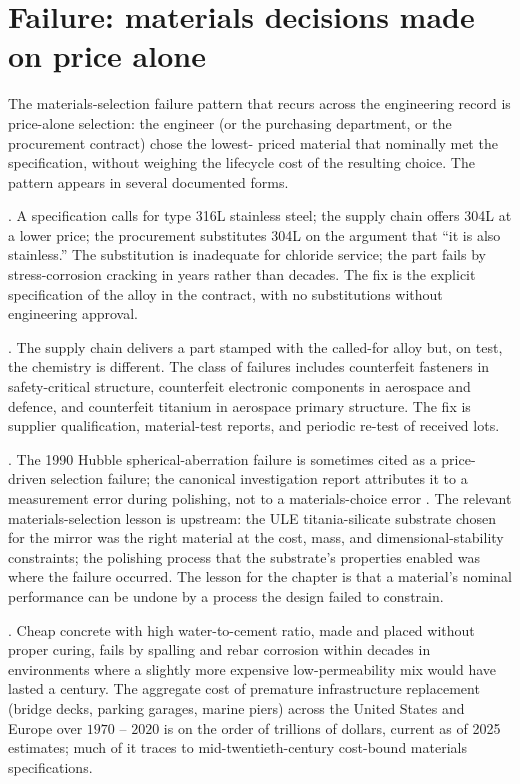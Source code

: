 \section{Failure: materials decisions made on price alone}

The materials-selection failure pattern that recurs across the
engineering record is price-alone selection: the engineer (or the
purchasing department, or the procurement contract) chose the lowest-
priced material that nominally met the specification, without
weighing the lifecycle cost of the resulting choice. The pattern
appears in several documented forms.

. A
specification calls for type 316L stainless steel; the supply chain
offers 304L at a lower price; the procurement substitutes 304L on the
argument that ``it is also stainless.'' The substitution is
inadequate for chloride service; the part fails by stress-corrosion
cracking in years rather than decades. The fix is the explicit
specification of the alloy in the contract, with no substitutions
without engineering approval.

. The supply chain
delivers a part stamped with the called-for alloy but, on test, the
chemistry is different. The class of failures includes counterfeit
fasteners in safety-critical structure, counterfeit electronic
components in aerospace and defence, and counterfeit titanium in
aerospace primary structure. The fix is supplier qualification,
material-test reports, and periodic re-test of received lots.

. The 1990 Hubble
spherical-aberration failure is sometimes cited as a price-driven
selection failure; the canonical investigation report attributes it
to a measurement error during polishing, not to a materials-choice
error \cite{acc:nasa-hubble-optical-systems-1990}. The relevant
materials-selection lesson is upstream: the ULE titania-silicate
substrate chosen for the mirror was the right material at the cost,
mass, and dimensional-stability constraints; the polishing process
that the substrate's properties enabled was where the failure
occurred. The lesson for the chapter is that a material's nominal
performance can be undone by a process the design failed to
constrain.

. Cheap
concrete with high water-to-cement ratio, made and placed without
proper curing, fails by spalling and rebar corrosion within decades
in environments where a slightly more expensive low-permeability mix
would have lasted a century. The aggregate cost of premature
infrastructure replacement (bridge decks, parking garages, marine
piers) across the United States and Europe over $1970$ -- $2020$ is
on the order of trillions of dollars, current as of 2025 estimates;
much of it traces to mid-twentieth-century cost-bound materials
specifications.

